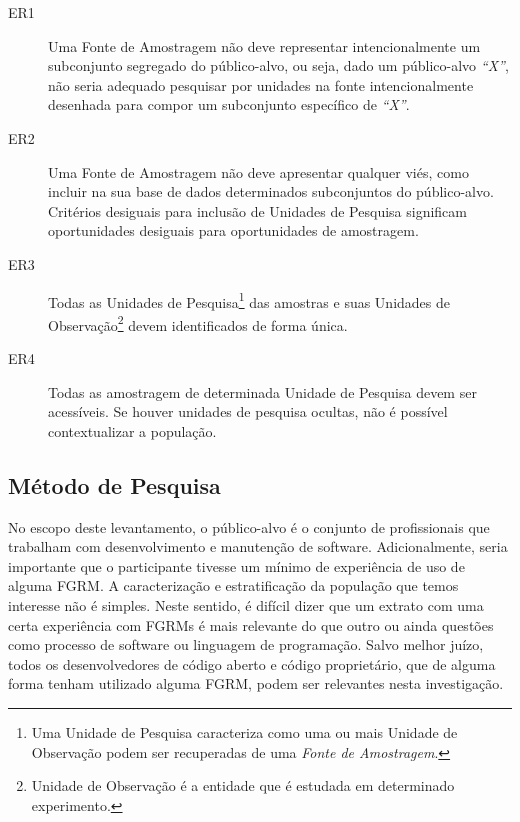 \begin{description}

    \item[ER1] Uma Fonte de Amostragem não deve representar intencionalmente um
               subconjunto segregado do público-alvo, ou seja, dado um
               público-alvo \textit{``X''}, não seria adequado pesquisar por
               unidades na fonte intencionalmente desenhada para compor um
               subconjunto específico de \textit{``X''}.

    \item[ER2] Uma Fonte de Amostragem não deve apresentar qualquer viés, como
               incluir na sua base de dados determinados subconjuntos do
               público-alvo.  Critérios desiguais para inclusão de Unidades de
               Pesquisa significam oportunidades desiguais para oportunidades
               de amostragem.

    \item[ER3] Todas as Unidades de Pesquisa\footnote{Uma Unidade de Pesquisa
               caracteriza como uma ou mais Unidade de Observação podem ser
               recuperadas de uma \textit{Fonte de Amostragem}.} das amostras e
               suas Unidades de Observação\footnote{Unidade de Observação é a
               entidade que é estudada em determinado experimento.}
               devem identificados de forma única.

    \item[ER4] Todas as amostragem de determinada Unidade de Pesquisa devem ser
               acessíveis. Se houver unidades de pesquisa ocultas,
               não é possível contextualizar a população.

\end{description}

\subsection{Método de Pesquisa}\label{subsec:pesq_metodologias}

No escopo deste levantamento, o público-alvo é o conjunto de profissionais que
trabalham com desenvolvimento e manutenção de software. Adicionalmente, seria
importante que o participante tivesse um mínimo de experiência de uso de alguma
FGRM\@. A caracterização e estratificação da população que temos interesse não
é simples. Neste sentido, é difícil dizer que um extrato com uma certa
experiência com FGRMs é mais relevante do que outro ou ainda questões como
processo de software ou linguagem de programação. Salvo melhor juízo, todos os
desenvolvedores de código aberto e código proprietário, que de alguma forma
tenham utilizado alguma FGRM, podem ser relevantes nesta investigação.

